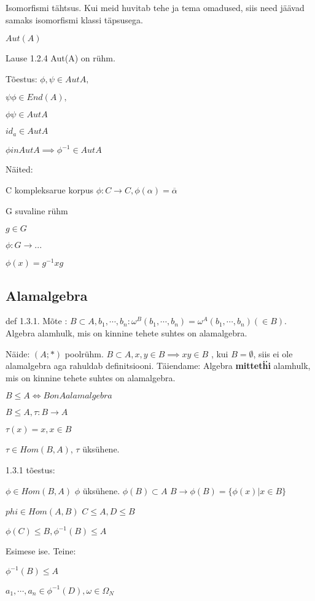 \documentclass[12pt]{article}
\begin{document}
Isomorfismi tähtsus. Kui meid huvitab tehe ja tema omadused, siis need jäävad samaks isomorfismi klassi täpsusega. 

$Aut(A)$ 

Lause 1.2.4 Aut(A) on rühm. 

Tõestus: 
$\phi,\psi \in AutA, $

$ \psi \phi \in End(A), $
 
$ \phi \psi \in AutA $
 
$ id_a \in AutA $
 
$ \phi in AutA \implies \phi^{-1} \in AutA $
 
 Näited:
 
 C kompleksarue korpus
 $\phi: C \rightarrow C, \phi(\alpha) = \overline{\alpha}$
 
 G suvaline r\"uhm
 
 $g \in G$
 
 $\phi : G \rightarrow ...$
 
 $\phi(x) = g^{-1} x g $
 
 \subsection{Alamalgebra}

 def 1.3.1. Mõte : $B \subset A, b_1,\cdots,b_n : \omega^B (b_1,\cdots,b_n) = \omega^A (b_1,\cdots,b_n) ( \in B).$ 
 Algebra alamhulk, mis on kinnine tehete suhtes on alamalgebra.
 
Näide: $(A;*)$ poolr\"uhm. $B \subset A, x,y \in B \implies xy \in B $ , kui $B = \emptyset$, siis ei ole alamalgebra aga rahuldab definitsiooni. Täiendame: 
  Algebra \textbf{mittet\"hi} alamhulk, mis on kinnine tehete suhtes on alamalgebra.
  
 $B \leq A \iff B on A alamalgebra$
 
$ B \leq A, \tau : B \rightarrow A$

$\tau(x) = x, x \in B$

$\tau \in Hom(B,A)$, $\tau$ \"uks\"uhene. 


1.3.1 tõestus:
 
$\phi \in Hom(B,A)$
$\phi $ \"uks\"uhene.
$\phi(B) \subset A$
$B \rightarrow \phi(B) = \{ \phi(x) | x \in B \}$

$phi \in Hom(A,B)$
$C \leq A , D \leq B $

$\phi(C) \leq B , \phi^{-1}(B) \leq A$

Esimese ise. Teine:

$\phi^{-1}(B) \leq A$

$a_1,\cdots, a_n \in \phi^{-1}(D), \omega \in \Omega_N$
\end{document}
